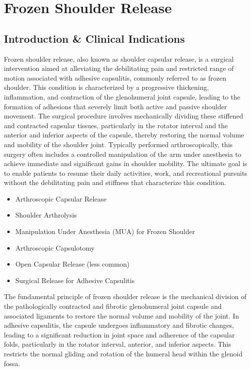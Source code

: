 \chapter{Frozen Shoulder Release}

\section*{Introduction \& Clinical Indications}
Frozen shoulder release, also known as shoulder capsular release, is a surgical intervention aimed at alleviating the debilitating pain and restricted range of motion associated with adhesive capsulitis, commonly referred to as frozen shoulder. This condition is characterized by a progressive thickening, inflammation, and contraction of the glenohumeral joint capsule, leading to the formation of adhesions that severely limit both active and passive shoulder movement. The surgical procedure involves mechanically dividing these stiffened and contracted capsular tissues, particularly in the rotator interval and the anterior and inferior aspects of the capsule, thereby restoring the normal volume and mobility of the shoulder joint. Typically performed arthroscopically, this surgery often includes a controlled manipulation of the arm under anesthesia to achieve immediate and significant gains in shoulder mobility. The ultimate goal is to enable patients to resume their daily activities, work, and recreational pursuits without the debilitating pain and stiffness that characterize this condition.

\begin{itemize}
  \item Arthroscopic Capsular Release
  \item Shoulder Arthrolysis
  \item Manipulation Under Anesthesia (MUA) for Frozen Shoulder
  \item Arthroscopic Capsulotomy
  \item Open Capsular Release (less common)
  \item Surgical Release for Adhesive Capsulitis
\end{itemize}

The fundamental principle of frozen shoulder release is the mechanical division of the pathologically contracted and fibrotic glenohumeral joint capsule and associated ligaments to restore the normal volume and mobility of the joint. In adhesive capsulitis, the capsule undergoes inflammatory and fibrotic changes, leading to a significant reduction in joint space and adherence of the capsular folds, particularly in the rotator interval, anterior, and inferior aspects. This restricts the normal gliding and rotation of the humeral head within the glenoid fossa.

